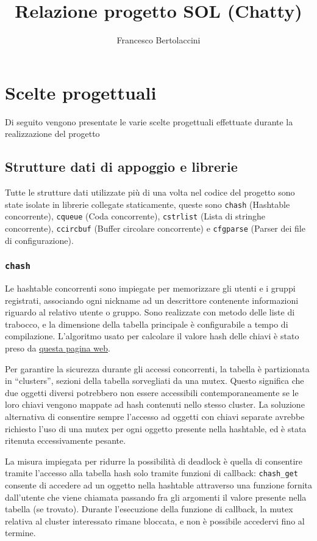 \documentclass[11pt]{article} %
\title{Relazione progetto SOL (Chatty)}
\author{Francesco Bertolaccini}
\begin{document}
\maketitle

\section{Scelte progettuali}
Di seguito vengono presentate le varie scelte progettuali effettuate durante la realizzazione del progetto

\subsection{Strutture dati di appoggio e librerie}
Tutte le strutture dati utilizzate più di una volta nel codice del progetto sono state isolate in librerie collegate staticamente, queste sono \texttt{chash} (Hashtable concorrente), \texttt{cqueue} (Coda concorrente), \texttt{cstrlist} (Lista di stringhe concorrente), \texttt{ccircbuf} (Buffer circolare concorrente) e \texttt{cfgparse} (Parser dei file di configurazione).

\subsubsection{\texttt{chash}}
Le hashtable concorrenti sono impiegate per memorizzare gli utenti e i gruppi registrati, associando ogni nickname ad un descrittore contenente informazioni riguardo al relativo utente o gruppo. Sono realizzate con metodo delle liste di trabocco, e la dimensione della tabella principale è configurabile a tempo di compilazione. L'algoritmo usato per calcolare il valore hash delle chiavi è stato preso da \href{http://www.cse.yorku.ca/~oz/hash.html}{questa pagina web}.

Per garantire la sicurezza durante gli accessi concorrenti, la tabella è partizionata in ``clusters'', sezioni della tabella sorvegliati da una mutex. Questo significa che due oggetti diversi potrebbero non essere accessibili contemporaneamente se le loro chiavi vengono mappate ad hash contenuti nello stesso cluster. La soluzione alternativa di consentire sempre l'accesso ad oggetti con chiavi separate avrebbe richiesto l'uso di una mutex per ogni oggetto presente nella hashtable, ed è stata ritenuta eccessivamente pesante.

La misura impiegata per ridurre la possibilità di deadlock è quella di consentire tramite l'accesso alla tabella hash solo tramite funzioni di callback: \texttt{chash\_get} consente di accedere ad un oggetto nella hashtable attraverso una funzione fornita dall'utente che viene chiamata passando fra gli argomenti il valore presente nella tabella (se trovato). Durante l'esecuzione della funzione di callback, la mutex relativa al cluster interessato rimane bloccata, e non è possibile accedervi fino al termine.
\end{document}
